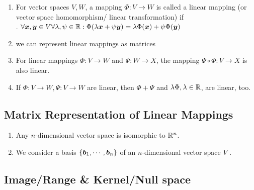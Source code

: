 \begin{enumerate}
    \item
    \begin{definition}
        For vector spaces $V, W$, a mapping $\Phi : V \to W$ is called a linear mapping (or vector space homomorphism/ linear transformation) if
        \hfill \cite{mfml/book/mml/Deisenroth-Faisal-Ong}
        \\
        .\hfill
        $
            \forall \bm{x}, \bm{y} \in V \forall \lambda , \psi  \in \mathbb{R} : 
            \Phi(\lambda \bm{x} + \psi \bm{y}) = \lambda \Phi(\bm{x}) + \psi \Phi(\bm{y})
        $
        \hfill \cite{mfml/book/mml/Deisenroth-Faisal-Ong}
    \end{definition}

    \item we can represent linear mappings as matrices
    \hfill \cite{mfml/book/mml/Deisenroth-Faisal-Ong}

    \item For linear mappings $\Phi : V \to W$ and $\Psi : W \to X$, the mapping $\Psi \circ \Phi : V \to X$ is also linear.
    \hfill \cite{mfml/book/mml/Deisenroth-Faisal-Ong}

    \item If $\Phi : V \to W, \Psi : V \to W$ are linear, then $\Phi + \Psi$ and $\lambda\Phi, \lambda \in \mathbb{R}$, are linear, too.
    \hfill \cite{mfml/book/mml/Deisenroth-Faisal-Ong}
\end{enumerate}



\subsection{Matrix Representation of Linear Mappings}

\begin{enumerate}
    \item Any $n$-dimensional vector space is isomorphic to $\mathbb{R}^n$.
    \hfill \cite{mfml/book/mml/Deisenroth-Faisal-Ong}

    \item We consider a basis $\left\{\bm{b}_1, \cdots , \bm{b}_n\right\}$ of an $n$-dimensional vector space $V$ .
    \hfill \cite{mfml/book/mml/Deisenroth-Faisal-Ong}
\end{enumerate}




\subsection{Image/Range \& Kernel/Null space}

